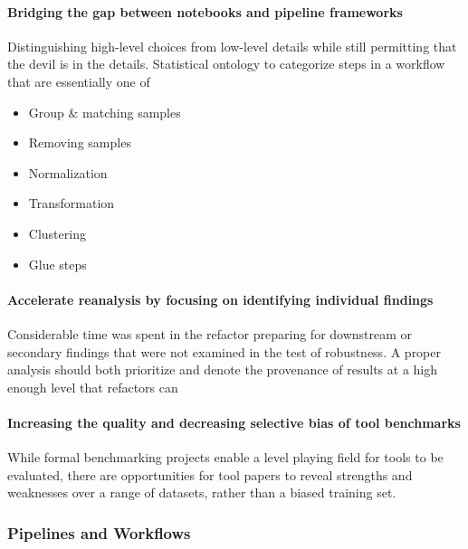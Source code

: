 \documentclass{drexelthesis}
\begin{document}
\paragraph{Bridging the gap between notebooks and pipeline frameworks}

Distinguishing high-level choices from low-level details while still permitting that the devil is in the details. Statistical ontology to categorize steps in a workflow that are essentially one of

\begin{itemize}
	\item Group $\&$ matching samples

	\item Removing samples

	\item Normalization

	\item Transformation

	\item Clustering

	\item Glue steps

\end{itemize}
\paragraph{Accelerate reanalysis by focusing on identifying individual findings}

Considerable time was spent in the refactor preparing for downstream or secondary findings that were not examined in the test of robustness. A proper analysis should both prioritize and denote the provenance of results at a high enough level that refactors can 

\paragraph{Increasing the quality and decreasing selective bias of tool benchmarks}

While formal benchmarking projects enable a level playing field for tools to be evaluated, there are opportunities for tool papers to reveal strengths and weaknesses over a range of datasets, rather than a biased training set.

\subsubsection{Pipelines and Workflows}
\end{document}

